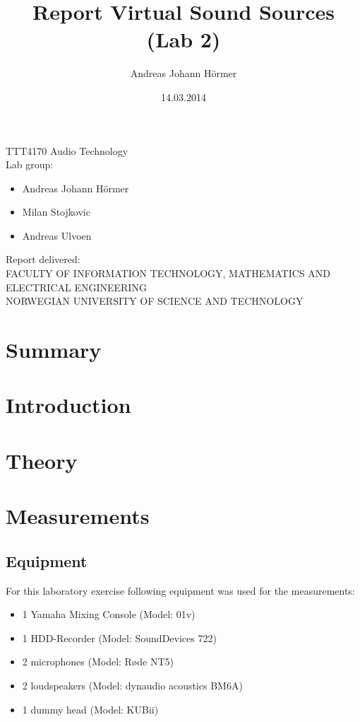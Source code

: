 \documentclass{article}
\title{Report Virtual Sound Sources (Lab 2)}
\author{Andreas Johann H\"ormer}
\date{14.03.2014}
\begin{document}
\thispagestyle{empty}
\maketitle
\thispagestyle{empty}
\begin{center}
TTT4170 Audio Technology\\[3cm]
Lab group:
\begin{itemize}
\item Andreas Johann H\"ormer
\item Milan Stojkovic
\item Andreas Ulvoen\\[3cm]
\end{itemize}
Report delivered: \\[6cm]
FACULTY OF INFORMATION TECHNOLOGY, MATHEMATICS AND ELECTRICAL ENGINEERING\\
NORWEGIAN UNIVERSITY OF SCIENCE AND TECHNOLOGY
\end{center}
\thispagestyle{empty}
\tableofcontents
\thispagestyle{empty}
\newpage
\section*{Summary}
\thispagestyle{empty}

\newpage
\setcounter{page}{1}
\section{Introduction}

\section{Theory}

\section{Measurements}
\subsection{Equipment}
For this laboratory exercise following equipment was used for the measurements:
\begin{itemize}
\item 1 Yamaha Mixing Console (Model: 01v)
\item 1 HDD-Recorder (Model: SoundDevices 722)
\item 2 microphones (Model: Røde NT5)
\item 2 loudspeakers (Model: dynaudio acoustics BM6A)
\item 1 dummy head (Model: KUBii)
\end{itemize}
\end{document}
